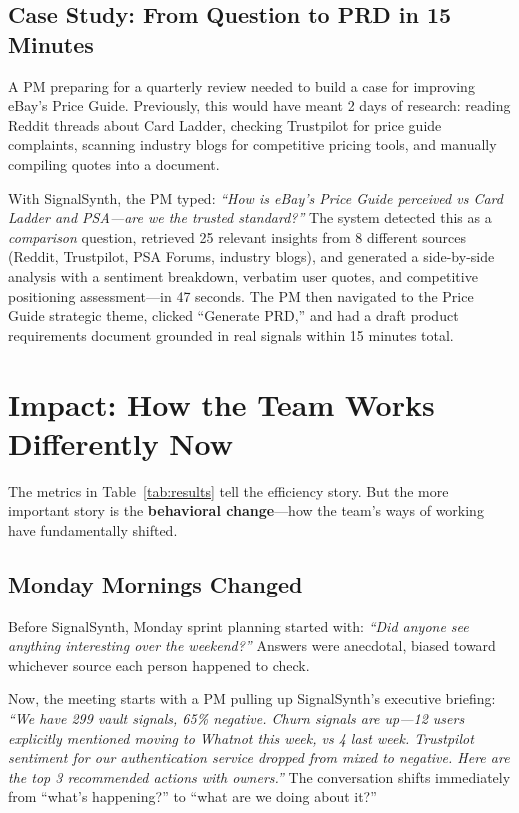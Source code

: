 \documentclass[11pt]{article}
\begin{document}
\subsection{Case Study: From Question to PRD in 15 Minutes}

A PM preparing for a quarterly review needed to build a case for improving eBay's Price Guide. Previously, this would have meant 2 days of research: reading Reddit threads about Card Ladder, checking Trustpilot for price guide complaints, scanning industry blogs for competitive pricing tools, and manually compiling quotes into a document.

With SignalSynth, the PM typed: \textit{``How is eBay's Price Guide perceived vs Card Ladder and PSA---are we the trusted standard?''} The system detected this as a \textit{comparison} question, retrieved 25 relevant insights from 8 different sources (Reddit, Trustpilot, PSA Forums, industry blogs), and generated a side-by-side analysis with a sentiment breakdown, verbatim user quotes, and competitive positioning assessment---in 47 seconds. The PM then navigated to the Price Guide strategic theme, clicked ``Generate PRD,'' and had a draft product requirements document grounded in real signals within 15 minutes total.

\section{Impact: How the Team Works Differently Now}

The metrics in Table~\ref{tab:results} tell the efficiency story. But the more important story is the \textbf{behavioral change}---how the team's ways of working have fundamentally shifted.

\subsection{Monday Mornings Changed}
Before SignalSynth, Monday sprint planning started with: \textit{``Did anyone see anything interesting over the weekend?''} Answers were anecdotal, biased toward whichever source each person happened to check.

Now, the meeting starts with a PM pulling up SignalSynth's executive briefing: \textit{``We have 299 vault signals, 65\% negative. Churn signals are up---12 users explicitly mentioned moving to Whatnot this week, vs 4 last week. Trustpilot sentiment for our authentication service dropped from mixed to negative. Here are the top 3 recommended actions with owners.''} The conversation shifts immediately from ``what's happening?'' to ``what are we doing about it?''
\end{document}
